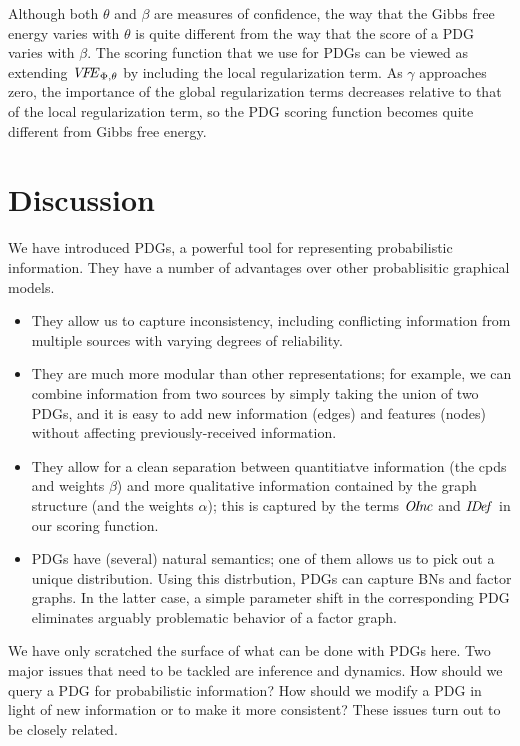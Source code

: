 Although both $\theta$ and $\beta$ are measures of confidence, 
the way that the Gibbs free energy varies with $\theta$ 
is quite different from the way that the score of a PDG
varies with $\beta$. 
The scoring function that we use for PDGs can be viewed as
extending ${\mathit{V\mkern-4mu F\mkern-4.5mu E}}_{\Phi,\theta}$ by including
the local regularization term.
As $\gamma$ approaches zero,
the importance of the global regularization terms decreases relative
to that of the local regularization term, so the PDG scoring function
becomes quite different from Gibbs free energy.

\section{Discussion}
We have introduced PDGs, a powerful tool for representing
probabilistic information. 
They have a number of advantages over other
probablisitic graphical models. 
\begin{itemize}
\item They allow us to capture inconsistency, including conflicting information
from multiple sources with varying degrees of reliability.
\item 
	They are much more modular 
	than other representations; for example, we can combine information from two sources by simply taking the union of two
	PDGs, and it is easy to add new information (edges)
	and features (nodes) without affecting previously-received information.
\item They allow for a clean separation between quantitiatve information (the
	cpds and weights $\beta$) and more qualitative information contained by
	the graph structure (and the weights $\alpha$); this is captured by the
	terms $\mathit{O\mskip-2.5muI\mskip-3.5mun\mskip-1.7muc}$ and $\mathit{I\mskip-3.0muD\mskip-2.5mue\mskip-1.5muf}_{}$ in our scoring function.
\item PDGs have (several) natural semantics; one of them allows us to
pick out a unique distribution.  Using this distrbution, PDGs
	can capture BNs and factor graphs.
In the latter case, a simple parameter shift in the corresponding PDG eliminates
arguably problematic behavior of a factor graph.
\end{itemize}

We have only scratched the surface of what can be done with PDGs here.
Two major issues that need to be tackled are inference and dynamics.
How should we query a PDG for probabilistic information? How should 
we modify a PDG in light of new information or to make it more consistent?
These issues turn out to be closely related.

